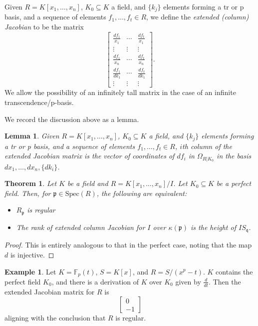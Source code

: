 \documentclass{amsart}[12pt]
\newcommand{\Spec}{\mathrm{Spec}}
\newcommand{\F}{\mathbb{F}}
\newcommand{\fp}{{\mathfrak p}}
\newcommand{\fq}{{\mathfrak q}}
\numberwithin{equation}{section}
\theoremstyle{plain} %
\newtheorem{thm}[equation]{Theorem}
\newtheorem{lem}[equation]{Lemma}
\theoremstyle{definition}
\newtheorem{ex}[equation]{Example}
\theoremstyle{remark}
\begin{document}
Given $R=K[x_1,\dots,x_n]$, $K_0\subseteq K$ a field, and $\{k_j\}$ elements forming a tr or p basis, and a sequence of elements $f_1,\dots,f_t\in R$, we define the \emph{extended (column) Jacobian} to be the matrix
\[ \begin{bmatrix} \frac{df_1}{x_1} & \cdots &  \frac{df_t}{x_1} \\ \vdots & \vdots &  \vdots \\ \frac{df_1}{x_n} & \cdots &  \frac{df_t}{x_n} \\ \frac{df_1}{dk_1} & \cdots &  \frac{df_t}{dk_1} \\ \vdots & \vdots &  \vdots\end{bmatrix}.\]
We allow the possibility of an infinitely tall matrix in the case of an infinite transcendence/p-basis.

We record the discussion above as a lemma.

\begin{lem} Given $R=K[x_1,\dots,x_n]$, $K_0\subseteq K$ a field, and $\{k_j\}$ elements forming a tr or p basis, and a sequence of elements $f_1,\dots,f_t\in R$, $i$th column of the extended Jacobian matrix is the vector of coordinates of $df_i$ in $\Omega_{R|K_0}$ in the basis $dx_1,\dots,dx_n, \{dk_i\}$.
\end{lem}


\begin{thm} Let $K$ be a field and $R=K[x_1,\dots,x_n]/I$. Let $K_0\subseteq K$ be a perfect field. Then, for $\fp\in \Spec(R)$, the following are equivalent:
\begin{itemize}
\item $R_\fp$ is regular
\item The rank of extended column Jacobian for $I$ over $\kappa(\fp)$ is the height of $I S_{\fq}$.
\end{itemize}
\end{thm}
\begin{proof}
This is entirely analogous to that in the perfect case, noting that the map $d$ is injective.
\end{proof}

\begin{ex} Let $K=\F_p(t)$, $S=K[x]$, and $R=S/(x^p-t)$. $K$ contains the perfect field $K_0$, and there is a derivation of $K$ over $K_0$ given by $\frac{d}{dt}$. Then the extended Jacobian matrix for $R$ is
\[ \begin{bmatrix} 0 \\ -1\end{bmatrix}\]
aligning with the conclusion that $R$ is regular.
\end{ex}
\end{document}
